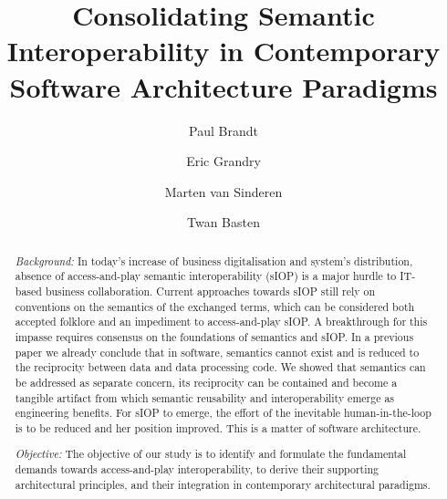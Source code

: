 \documentclass[sort&compress,preprint,authoryear,3p,twocolumn]{elsarticle}
\begin{document}
\begin{frontmatter}

  \title{Consolidating Semantic Interoperability in Contemporary
Software Architecture Paradigms}

\author[1]{Paul
Brandt} \author[2]{Eric
Grandry} \author[3]{Marten van
Sinderen} \author[1]{Twan
Basten}

   

\begin{abstract}
\emph{Background:} In today's increase of business digitalisation and
system's distribution, absence of access-and-play semantic
interoperability (sIOP) is a major hurdle to IT-based business
collaboration. Current approaches towards sIOP still rely on conventions
on the semantics of the exchanged terms, which can be considered both
accepted folklore and an impediment to access-and-play sIOP. A
breakthrough for this impasse requires consensus on the foundations of
semantics and sIOP. In a previous paper we already conclude that in
software, semantics cannot exist and is reduced to the reciprocity
between data and data processing code. We showed that semantics can be
addressed as separate concern, its reciprocity can be contained and
become a tangible artifact from which semantic reusability and
interoperability emerge as engineering benefits. For sIOP to emerge, the
effort of the inevitable human-in-the-loop is to be reduced and her
position improved. This is a matter of software architecture.

\emph{Objective:} The objective of our study is to identify and
formulate the fundamental demands towards access-and-play
interoperability, to derive their supporting architectural principles,
and their integration in contemporary architectural paradigms.


\end{abstract}
\end{frontmatter}
\end{document}
